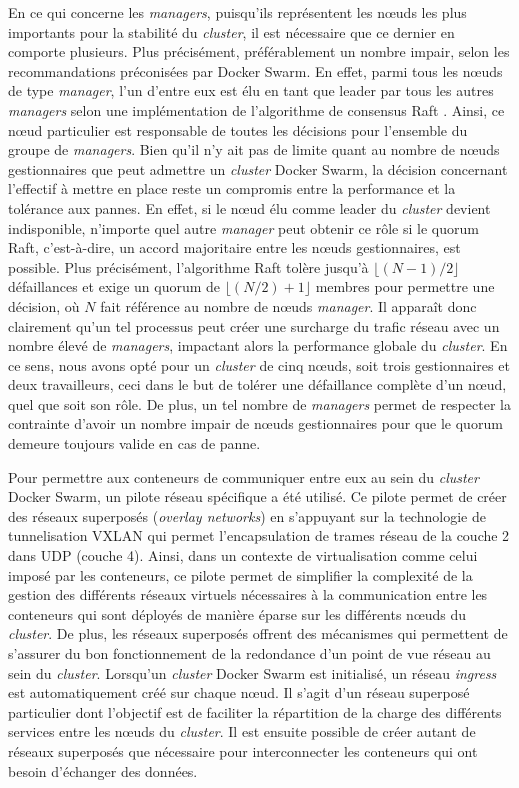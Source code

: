 En ce qui concerne les \textit{managers}, puisqu'ils représentent les n\oe{}uds les plus importants pour la stabilité du \textit{cluster}, il est nécessaire que ce dernier en comporte plusieurs. Plus précisément, préférablement un nombre impair, selon les recommandations préconisées par Docker Swarm. En effet, parmi tous les n\oe{}uds de type \textit{manager}, l'un d'entre eux est élu en tant que leader par tous les autres \textit{managers} selon une implémentation de l'algorithme de consensus Raft \citep{MacKenzie2006}. Ainsi, ce n\oe{}ud particulier est responsable de toutes les décisions pour l'ensemble du groupe de \textit{managers}. Bien qu'il n'y ait pas de limite quant au nombre de n\oe{}uds gestionnaires que peut admettre un \textit{cluster} Docker Swarm, la décision concernant l'effectif à mettre en place reste un compromis entre la performance et la tolérance aux pannes. En effet, si le n\oe{}ud élu comme leader du \textit{cluster} devient indisponible, n'importe quel autre \textit{manager} peut obtenir ce rôle si le quorum Raft, c'est-à-dire, un accord majoritaire entre les n\oe{}uds gestionnaires, est possible. Plus précisément, l'algorithme Raft tolère jusqu'à $\lfloor(N-1)/2\rfloor$ défaillances et exige un quorum de $\lfloor(N/2) + 1\rfloor$ membres pour permettre une décision, où $N$ fait référence au nombre de n\oe{}uds \textit{manager}. Il apparaît donc clairement qu'un tel processus peut créer une surcharge du trafic réseau avec un nombre élevé de \textit{managers}, impactant alors la performance globale du \textit{cluster}. En ce sens, nous avons opté pour un \textit{cluster} de cinq n\oe{}uds, soit trois gestionnaires et deux travailleurs, ceci dans le but de tolérer une défaillance complète d'un n\oe{}ud, quel que soit son rôle. De plus, un tel nombre de \textit{managers} permet de respecter la contrainte d'avoir un nombre impair de n\oe{}uds gestionnaires pour que le quorum demeure toujours valide en cas de panne.

Pour permettre aux conteneurs de communiquer entre eux au sein du \textit{cluster} Docker Swarm, un pilote réseau spécifique a été utilisé. Ce pilote permet de créer des réseaux superposés (\textit{overlay networks}) en s'appuyant sur la technologie de tunnelisation \ac{VXLAN} \citep{rfc7348} qui permet l'encapsulation de trames réseau de la couche 2 dans \acs{UDP} (couche 4). Ainsi, dans un contexte de virtualisation comme celui imposé par les conteneurs, ce pilote permet de simplifier la complexité de la gestion des différents réseaux virtuels nécessaires à la communication entre les conteneurs qui sont déployés de manière éparse sur les différents n\oe{}uds du \textit{cluster}. De plus, les réseaux superposés offrent des mécanismes qui permettent de s'assurer du bon fonctionnement de la redondance d'un point de vue réseau au sein du \textit{cluster}. Lorsqu'un \textit{cluster} Docker Swarm est initialisé, un réseau \textit{ingress} est automatiquement créé sur chaque n\oe{}ud. Il s'agit d'un réseau superposé particulier dont l'objectif est de faciliter la répartition de la charge des différents services entre les n\oe{}uds du \textit{cluster}. Il est ensuite possible de créer autant de réseaux superposés que nécessaire pour interconnecter les conteneurs qui ont besoin d'échanger des données.

